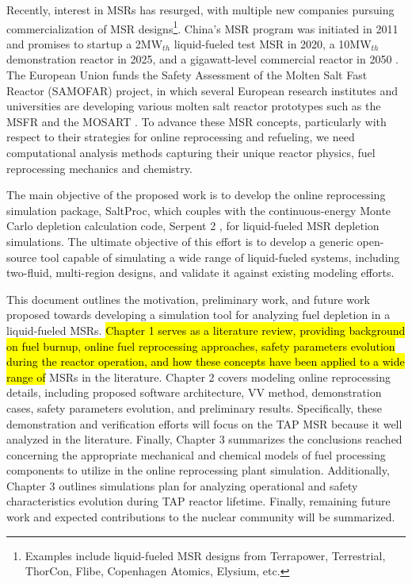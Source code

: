 Recently, interest in \glspl{MSR} has resurged, with multiple new companies 
pursuing commercialization of \gls{MSR} designs\footnote{Examples 
include liquid-fueled \gls{MSR} designs from Terrapower, Terrestrial, 
ThorCon, Flibe, Copenhagen Atomics, Elysium, etc.}. China's \gls{MSR} program 
was initiated in 2011 and promises to startup a 2MW$_{th}$ 
liquid-fueled test \gls{MSR} in 2020, a 10MW$_{th}$ 
demonstration reactor in 2025, and a gigawatt-level 
commercial reactor in 2050 \cite{zhang_review_2018}. The European 
Union funds the Safety Assessment of the Molten Salt Fast Reactor 
(SAMOFAR) project, in which several European research institutes and 
universities are developing various molten salt reactor prototypes 
such as the \gls{MSFR} \cite{fiorina_molten_2013} and the \gls{MOSART} 
\cite{ignatiev_molten_2014}.
To advance these \gls{MSR} concepts, particularly with respect 
to their strategies for online reprocessing and refueling, 
we need computational analysis methods capturing their unique reactor physics, 
 fuel reprocessing mechanics and chemistry. 

The main objective of the proposed work is to develop the online 
reprocessing simulation package, SaltProc, which couples with the 
continuous-energy Monte Carlo depletion calculation code, Serpent 2 
\cite{leppanen_serpent_2015}, for liquid-fueled \gls{MSR} depletion 
simulations. The ultimate objective of this effort is to develop a generic 
open-source tool capable of simulating a wide range of liquid-fueled 
systems, including two-fluid, multi-region designs, and validate it against 
existing modeling efforts. 

This document outlines the motivation, preliminary work, and future work 
proposed towards developing a simulation tool for analyzing fuel depletion in 
a liquid-fueled \glspl{MSR}. \hl{Chapter 1 serves as a literature review, 
providing background on fuel burnup, online fuel reprocessing approaches, 
safety parameters evolution during the reactor operation, and how these 
concepts have been applied to a wide range of} \glspl{MSR} in the literature. 
Chapter 2 covers modeling online reprocessing details, including proposed 
software architecture, \gls{VV} method, demonstration cases, safety 
parameters evolution, and preliminary results. Specifically, these 
demonstration and verification efforts will 
focus on the \gls{TAP} \gls{MSR} because it well analyzed in the literature. 
Finally, Chapter 3 summarizes the conclusions reached concerning the 
appropriate mechanical and chemical models of fuel processing 
components to utilize in the online reprocessing plant simulation. 
Additionally, Chapter 3 outlines simulations plan for analyzing operational 
and safety characteristics evolution during \gls{TAP} reactor lifetime. 
Finally, remaining future work and expected contributions to the 
nuclear community will be summarized.

